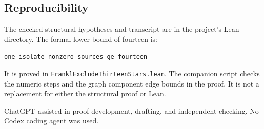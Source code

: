 \documentclass[
  11pt,
]{article}
\begin{document}
\subsection{Reproducibility}\label{reproducibility}

The checked structural hypotheses and transcript are in the project's
Lean directory. The formal lower bound of fourteen is:

\noindent
\texttt{one\_isolate\_nonzero\_sources\_ge\_fourteen}

It is proved in
\texttt{FranklExcludeThirteenStars.lean}. The companion script checks
the numeric steps and the graph component edge bounds in the proof. It
is not a replacement for either the structural proof or Lean.

ChatGPT assisted in proof development, drafting, and independent
checking. No Codex coding agent was used.
\end{document}
